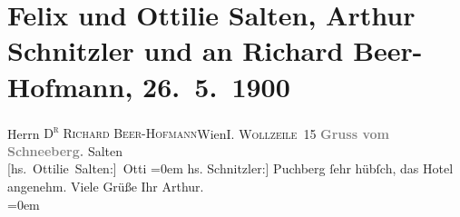

         
         \renewcommand{\erwaehntePersonen}{Personen: Richard Beer-Hofmann}
         \renewcommand{\erwaehnteOrte}{Orte: Puchberg am Schneeberg, Schneeberg, Wien, Wollzeile}
         \renewcommand{\erwaehnteWerke}{}
               \section[Felix und Ottilie Salten, Arthur Schnitzler und an Richard Beer-Hofmann, 26. 5. 1900]{ Felix und Ottilie Salten, Arthur Schnitzler und an Richard
               Beer-Hofmann, 26. 5. 1900}\nopagebreak{}\rehead{ }\begin{ledgroupsized}[t]{13cm}\normalsize\beginnumbering \toendnotes[C]{\smallbreak\pagebreak[2]} 
\pstart{}{\pb}Herrn \textsc{D\textsuperscript{r} Richard Beer-Hofmann}\pend{}\pstart{}Wien\pend{}\pstart{}\textsc{I. Wollzeile 15}\pend{}{\bigskip}\pstart
           \noindent{}\centering{}{\pb}\textcolor{gray}{\textbf{Gruss vom Schneeberg.}}\pend
           \pstart
           \spacefill\mbox{Salten}{\\[\baselineskip]}\spacefill\mbox{{[}hs. Ottilie Salten:{]} Otti}\pend
           \leftskip=0em{}\pstart
           \noindent{}{[}hs. Schnitzler:{]} Puchberg ſehr hübſch, das Hotel angenehm. Viele
               Grüße\pend
           \pstart
           Ihr \spacefill\mbox{Arthur.}{\\[\baselineskip]}\pend
           \leftskip=0em{}
         
         \endnumbering{}\end{ledgroupsized}  \newcommand{\dateiname}{L01041}\newcommand{\titel}{Felix und Ottilie Salten, Arthur Schnitzler und an Richard Beer-Hofmann, 26. 5. 1900}\newcommand{\editorInnen}{Martin Anton Müller und Gerd-Hermann Susen}
      